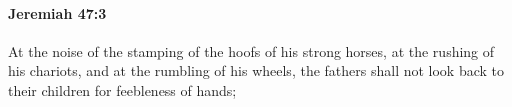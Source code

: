 
		\paragraph{Jeremiah 47:3} %
			\label{JEREMIAH-47-3}

			At the noise of the stamping of the hoofs of his strong horses, at the rushing of his chariots, and at the rumbling of his wheels, the fathers shall not look back to their children for feebleness of hands;


